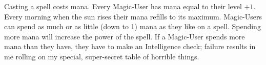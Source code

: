 \documentclass[twocolumn]{amsart}
\begin{document}
Casting a spell costs mana.
Every Magic-User has mana equal to their level $+1$.
Every morning when the sun rises their mana refills to its maximum.
Magic-Users can spend as much or as little (down to 1) mana as they like on a spell.
Spending more mana will increase the power of the spell.
If a Magic-User spends more mana than they have, they have to make an Intelligence check; failure results in me rolling on my special, super-secret table of horrible things.
\end{document}
